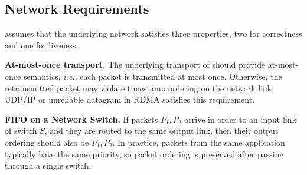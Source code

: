 





\iffalse
\subsection{Network Requirements}
\label{sec:assumptions}

\sys assumes that the underlying network satisfies three properties, two for correctness and one for liveness.

\textbf{At-most-once transport.}
The underlying transport of \sys should provide at-most-once semantics, \textit{i.e.}, each packet is transmitted at most once.
Otherwise, the retransmitted packet may violate timestamp ordering on the network link.
UDP/IP or unreliable datagram in RDMA satisfies this requirement.

\textbf{FIFO on a Network Switch.}
If packets $P_1, P_2$ arrive in order to an input link of switch $S$, and they are routed to the same output link, then their output ordering should also be $P_1, P_2$.
In practice, packets from the same application typically have the same priority, so packet ordering is preserved after passing through a single switch.

